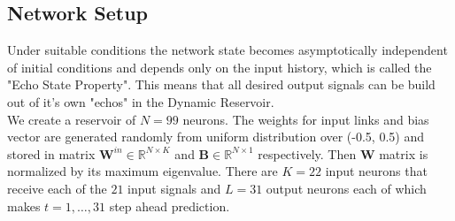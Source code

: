 %


\subsection{Network Setup}
\indent \indent
    Under suitable conditions the network state becomes asymptotically independent of initial conditions and depends only on the input history, which is called the "Echo State Property". This means that all desired output signals can be build out of it's own "echos" in the Dynamic Reservoir. \cite{ESNinAudioProcessing}\\
	We create a reservoir of $N = 99$ neurons. %
	   The weights  for input links  
	 and bias vector 
	 are generated randomly from uniform distribution over (-0.5, 0.5) and stored in matrix $\mathbf{W}^{in} \in \mathbb{R}^{N\times K}$  and $\mathbf{B} \in \mathbb{R}^{N\times 1}$ respectively. Then 
	 $\mathbf{W}$ matrix is normalized by its maximum eigenvalue. There are $K=22$ input neurons that receive each of the $21$ input signals and $L=31$ output neurons each of which makes $t=1,\hdots,31$ step ahead prediction.
\\

